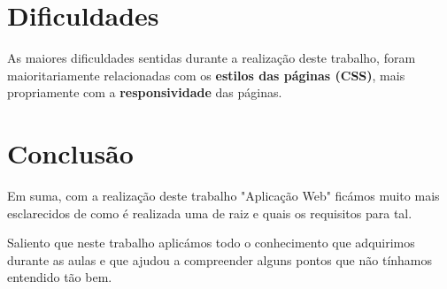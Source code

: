 \documentclass[11pt]{article}   %
\begin{document}
\section{Dificuldades}

As maiores dificuldades sentidas durante a realização deste trabalho, foram maioritariamente
relacionadas com os \textbf{estilos das páginas (CSS)}, mais propriamente com a \textbf{responsividade} das
páginas.

\section{Conclusão} %

\hspace{0,5cm}Em suma, com a realização deste trabalho "Aplicação Web" ficámos muito mais esclarecidos de como é
realizada uma  de raiz e quais os requisitos para tal. \par
Saliento que neste trabalho aplicámos todo o conhecimento que adquirimos durante as aulas e que ajudou
a compreender alguns pontos que não tínhamos entendido tão bem.

\end{document}
